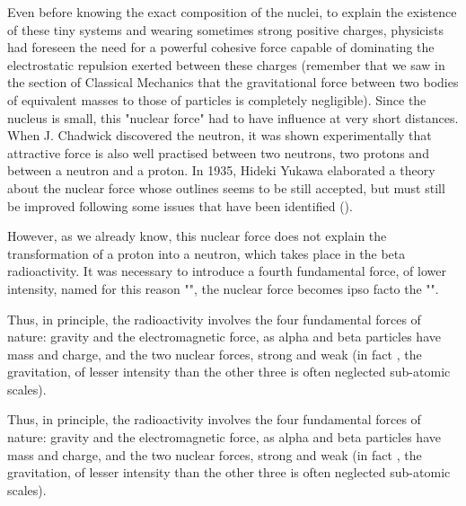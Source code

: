 	Even before knowing the exact composition of the nuclei, to explain the existence of these tiny systems and wearing sometimes strong positive charges, physicists had foreseen the need for a powerful cohesive force capable of dominating the electrostatic repulsion exerted between these charges (remember that we saw in the section of Classical Mechanics that the gravitational force between two bodies of equivalent masses to those of particles is completely negligible). Since the nucleus is small, this "nuclear force" had to have influence at very short distances. When J. Chadwick discovered the neutron, it was shown experimentally that attractive force is also well practised between two neutrons, two protons and between a neutron and a proton. In 1935, Hideki Yukawa elaborated a theory about the nuclear force whose outlines seems to be still accepted, but must still be improved following some issues that have been identified ().
	
	However, as we already know, this nuclear force does not explain the transformation of a proton into a neutron, which takes place in the beta radioactivity. It was necessary to introduce a fourth fundamental force, of lower intensity, named for this reason "", the nuclear force becomes ipso facto the "".
	
	Thus, in principle, the radioactivity involves the four fundamental forces of nature: gravity and the electromagnetic force, as alpha and beta particles have mass and charge, and the two nuclear forces, strong and weak (in fact , the gravitation, of lesser intensity than the other three is often neglected  sub-atomic scales).
	
	Thus, in principle, the radioactivity involves the four fundamental forces of nature: gravity and the electromagnetic force, as alpha and beta particles have mass and charge, and the two nuclear forces, strong and weak (in fact , the gravitation, of lesser intensity than the other three is often neglected  sub-atomic scales).
	
